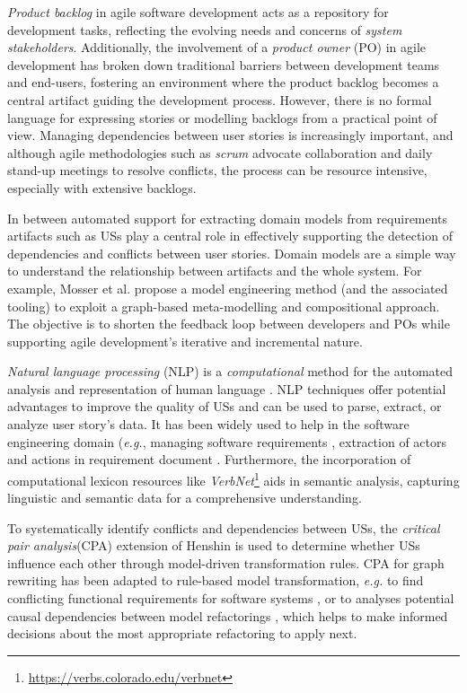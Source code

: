 \emph{Product backlog} in agile software development acts as a repository for development tasks, reflecting the evolving needs and concerns of \emph{system stakeholders}\cite{sedano2019product}. Additionally, the involvement of a \emph{product owner} (PO) in agile development has broken down traditional barriers between development teams and end-users, fostering an environment where the product backlog becomes a central artifact guiding the development process\cite{sedano2019product}. However, there is no formal language for expressing stories or modelling backlogs from a practical point of view. Managing dependencies between user stories is increasingly important, and although agile methodologies such as \emph{scrum} advocate collaboration and daily stand-up meetings to resolve conflicts, the process can be resource intensive, especially with extensive backlogs.

In between automated support for extracting domain models from requirements artifacts such as USs play a central role in effectively supporting the detection of dependencies and conflicts between user stories. Domain models are a simple way to understand the relationship between artifacts and the whole system. For example, Mosser et al. propose a model engineering method (and the associated tooling) to exploit a graph-based meta-modelling and compositional approach. The objective is to shorten the feedback loop between developers and POs while supporting agile development’s iterative and incremental nature\cite{mosser2022modelling}.

\emph{Natural language processing} (NLP) is a \emph{computational} method for the automated analysis and representation of human language \cite{cambria2014jumping}. NLP techniques offer potential advantages to improve the quality of USs and can be used to parse, extract, or analyze user story's data. It has been widely used to help in the software engineering domain (\emph{e.g.}, managing software requirements \cite{Arias2018}, extraction of actors and actions in requirement document \cite{al2018use}. Furthermore, the incorporation of computational lexicon resources like \emph{VerbNet}\footnote{\href{https://verbs.colorado.edu/verbnet}{https://verbs.colorado.edu/verbnet}} aids in semantic analysis, capturing linguistic and semantic data for a comprehensive understanding.

To systematically identify conflicts and dependencies between USs, the \emph{critical pair analysis}(CPA) extension of Henshin is used to determine whether USs influence each other through model-driven transformation rules. CPA for graph rewriting \cite{hartmanis2006monographs} has been adapted to rule-based model transformation, \emph{e.g.} to find conflicting functional requirements for software systems \cite{hausmann2002detection}, or to analyses potential causal dependencies between model refactorings \cite{mens2007analysing}, which helps to make informed decisions about the most appropriate refactoring to apply next.

